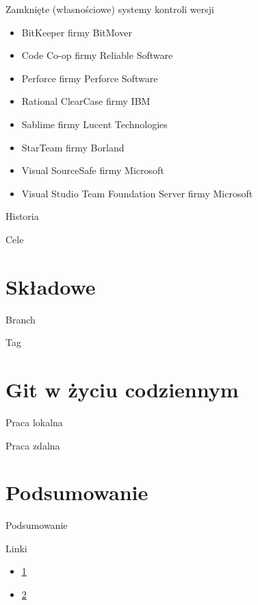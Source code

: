 \documentclass{beamer}
\begin{document}
\begin{frame}{Zamknięte (własnościowe) systemy kontroli wersji}
\begin{itemize}
	\item BitKeeper firmy BitMover
	\item Code Co-op firmy Reliable Software
	\item Perforce firmy Perforce Software
	\item Rational ClearCase firmy IBM
	\item Sablime firmy Lucent Technologies
	\item StarTeam firmy Borland
	\item Visual SourceSafe firmy Microsoft
	\item Visual Studio Team Foundation Server firmy Microsoft
\end{itemize}
\end{frame}

\begin{frame}{Historia}
\end{frame}

\begin{frame}{Cele}
\end{frame}

\section{Składowe}

\begin{frame}{Branch}
\end{frame}

\begin{frame}{Tag}
\end{frame}

\section{Git w życiu codziennym}

\begin{frame}{Praca lokalna}
\end{frame}

\begin{frame}{Praca zdalna}
\end{frame}

\section{Podsumowanie}

\begin{frame}{Podsumowanie}
\end{frame}

\begin{frame}{Linki}
\begin{itemize}
  \item \href{http://git-scm.com/book/pl/Pierwsze-kroki-Wprowadzenie-do-kontroli-wersji}{1}
  \item \href{https://github.com/piecioshka/git-presentation}{2}
\end{itemize}
\end{frame}
\end{document}
